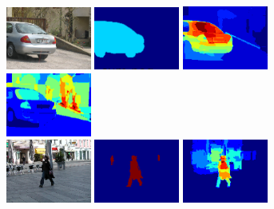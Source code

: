 \begin{figure}[tbp]
	\begin{center}
        \includegraphics[width=28mm]{images/car1_img.png}\hspace*{0.7ex}
        \includegraphics[width=28mm]{images/car1_gt.png}\hspace*{0.7ex}
        \includegraphics[width=28mm]{images/car1_pos.png}\hspace*{0.7ex}
        \includegraphics[width=28mm]{images/car1_neg.png}\hspace*{0.7ex}\\
        \vspace{1mm}
        \includegraphics[width=28mm]{images/person1_img.png}\hspace*{0.7ex}
        \includegraphics[width=28mm]{images/person1_gt.png}\hspace*{0.7ex}
        \includegraphics[width=28mm]{images/person1_pos.png}\hspace*{0.7ex}

\end{center}
\end{figure}
